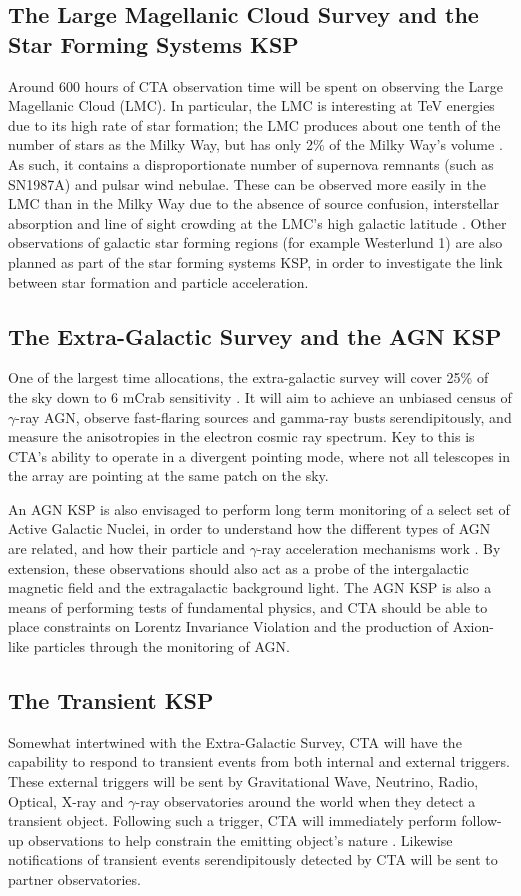 \subsection{The Large Magellanic Cloud Survey and the Star Forming Systems KSP} Around 600 hours of CTA observation time will be spent on observing the Large Magellanic Cloud (LMC). In particular, the LMC is interesting at TeV energies due to its high rate of star formation; the LMC produces about one tenth of the number of stars as the Milky Way, but has only 2\% of the Milky Way's volume \cite{scienceCTA}.
As such, it contains a disproportionate number of supernova remnants (such as SN1987A) and pulsar wind nebulae.  These can be observed more easily in the LMC than in the Milky Way due to the absence of source confusion, interstellar absorption and line of sight crowding at the LMC's high galactic latitude \cite{scienceCTA}. Other observations of galactic star forming regions (for example Westerlund 1) are also planned as part of the star forming systems KSP, in order to investigate the link between star formation and particle acceleration.

\subsection{The Extra-Galactic Survey and the AGN KSP} One of the largest time allocations, the extra-galactic survey will cover 25\% of the sky down to 6 mCrab sensitivity \cite{scienceCTA}. It will aim to achieve an unbiased census of $\gamma$-ray AGN, observe fast-flaring sources and gamma-ray busts serendipitously, and measure the anisotropies in the electron cosmic ray spectrum. Key to this is CTA's ability to operate in a divergent pointing mode, where not all telescopes in the array are pointing at the same patch on the sky. 

An AGN KSP is also envisaged to perform long term monitoring of a select set of Active Galactic Nuclei, in order to understand how the different types of AGN are related, and how their particle and $\gamma$-ray acceleration mechanisms work \cite{scienceCTA}. By extension, these observations should also act as a probe of the intergalactic magnetic field and the extragalactic background light. The AGN KSP is also a means of performing tests of fundamental physics, and CTA should be able to place constraints on Lorentz Invariance Violation and the production of Axion-like particles through the monitoring of AGN. 

\subsection{The Transient KSP} Somewhat intertwined with the Extra-Galactic Survey, CTA will have the capability to respond to transient events from both internal and external triggers. These external triggers will be sent by Gravitational Wave, Neutrino, Radio, Optical, X-ray and $\gamma$-ray observatories around the world when they detect a transient object. Following such a trigger, CTA will immediately perform follow-up observations to help constrain the emitting object's nature \cite{scienceCTA}. Likewise notifications of transient events serendipitously detected by CTA will be sent to partner observatories.

